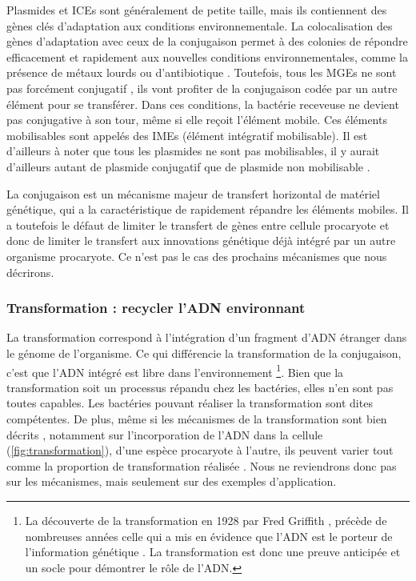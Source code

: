 Plasmides et ICEs sont généralement de petite taille, mais ils contiennent des gènes clés d'adaptation aux conditions environnementale. La colocalisation des gènes d'adaptation avec ceux de la conjugaison permet à des colonies de répondre efficacement et rapidement aux nouvelles conditions environnementales, comme la présence de métaux lourds ou d'antibiotique \cite{botelho_role_2021}. Toutefois, tous les MGEs ne sont pas forcément conjugatif \cite{valentine_mobilization_1988}, ils vont profiter de la conjugaison codée par un autre élément pour se transférer. Dans ces conditions, la bactérie receveuse ne devient pas conjugative à son tour, même si elle reçoit l'élément mobile. Ces éléments mobilisables sont appelés des IMEs (élément intégratif mobilisable). Il est d'ailleurs à noter que tous les plasmides ne sont pas mobilisables, il y aurait d'ailleurs autant de plasmide conjugatif que de plasmide non mobilisable \cite{smillie_mobility_2010}.

La conjugaison est un mécanisme majeur de transfert horizontal de matériel génétique, qui a la caractéristique de rapidement répandre les éléments mobiles. Il a toutefois le défaut de limiter le transfert de gènes entre cellule procaryote et donc de limiter le transfert aux innovations génétique déjà intégré par un autre organisme procaryote. Ce n'est pas le cas des prochains mécanismes que nous décrirons.   

\subsubsection{Transformation : recycler l'ADN environnant}

La transformation correspond à l'intégration d'un fragment d'ADN étranger dans le génome de l'organisme. Ce qui  différencie la transformation de la conjugaison, c'est que l'ADN intégré est libre dans l'environnement
\footnote{La découverte de la transformation en 1928 par Fred Griffith \cite{griffith_significance_1928}, précède de nombreuses années celle qui a mis en évidence que l'ADN est le porteur de l'information génétique \cite{avery_studies_1944}. La transformation est donc une preuve anticipée et un socle pour démontrer le rôle de l'ADN.}. Bien que la transformation soit un processus répandu chez les bactéries, elles n'en sont pas toutes capables. Les bactéries pouvant réaliser la transformation sont dites compétentes. De plus, même si les mécanismes de la transformation sont bien décrits \cite{johnston_bacterial_2014,dubnau_mechanisms_2019}, notamment sur l'incorporation de l'ADN dans la cellule (\autoref{fig:transformation}), d'une espèce procaryote à l'autre, ils peuvent varier tout comme la proportion de transformation réalisée \cite{stewart_biology_1986}. Nous ne reviendrons donc pas sur les mécanismes, mais seulement sur des exemples d'application.

